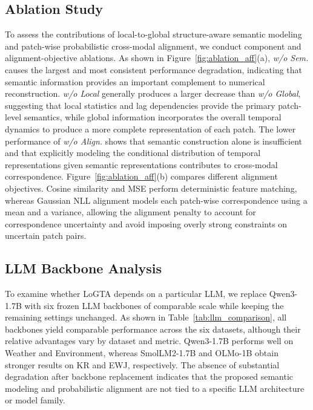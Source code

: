 \documentclass[letterpaper]{article} %
\newcommand{\method}{LoGTA}
\begin{document}
\subsection{Ablation Study}

\noindent To assess the contributions of local-to-global structure-aware semantic modeling and patch-wise probabilistic cross-modal alignment, we conduct component and alignment-objective ablations. As shown in Figure~\ref{fig:ablation_aff}(a), \textit{w/o Sem.} causes the largest and most consistent performance degradation, indicating that semantic information provides an important complement to numerical reconstruction. \textit{w/o Local} generally produces a larger decrease than \textit{w/o Global}, suggesting that local statistics and lag dependencies provide the primary patch-level semantics, while global information incorporates the overall temporal dynamics to produce a more complete representation of each patch. The lower performance of \textit{w/o Align.} shows that semantic construction alone is insufficient and that explicitly modeling the conditional distribution of temporal representations given semantic representations contributes to cross-modal correspondence. Figure~\ref{fig:ablation_aff}(b) compares different alignment objectives. Cosine similarity and MSE perform deterministic feature matching, whereas Gaussian NLL alignment models each patch-wise correspondence using a mean and a variance, allowing the alignment penalty to account for correspondence uncertainty and avoid imposing overly strong constraints on uncertain patch pairs.

\subsection{LLM Backbone Analysis}

\noindent To examine whether \method{} depends on a particular LLM, we replace Qwen3-1.7B with six frozen LLM backbones of comparable scale while keeping the remaining settings unchanged. As shown in Table~\ref{tab:llm_comparison}, all backbones yield comparable performance across the six datasets, although their relative advantages vary by dataset and metric. Qwen3-1.7B performs well on Weather and Environment, whereas SmolLM2-1.7B and OLMo-1B obtain stronger results on KR and EWJ, respectively. The absence of substantial degradation after backbone replacement indicates that the proposed semantic modeling and probabilistic alignment are not tied to a specific LLM architecture or model family.
\end{document}
